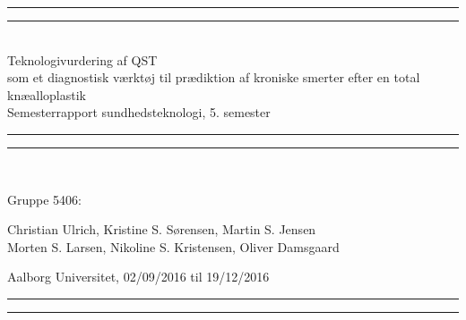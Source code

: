 \clearpage
\thispagestyle{empty}

\begin{center}
	\vspace*{\baselineskip}
	\rule{\textwidth}{1.6pt}\vspace*{-\baselineskip}\vspace*{2pt} %
	\rule{\textwidth}{0.4pt}\\[\baselineskip] %
	
	{\huge Teknologivurdering af QST \\\hspace*{2ex} som et diagnostisk værktøj til prædiktion af kroniske  smerter efter en total knæalloplastik\\[0.5\baselineskip] \large Semesterrapport sundhedsteknologi, 5. semester}\\[0.2\baselineskip] %
	
	\rule{\textwidth}{0.4pt}\vspace*{-\baselineskip}\vspace{3.2pt} %
	\rule{\textwidth}{1.6pt}\\[\baselineskip] %
	\vspace*{5\baselineskip}
	\vspace*{\fill}
	\scshape %
	{\Large Gruppe 5406:\par}
	Christian Ulrich, Kristine S. Sørensen, Martin S. Jensen \\
	Morten S. Larsen, Nikoline S. Kristensen, Oliver Damsgaard
	
	\vspace*{.2\baselineskip} %
	Aalborg Universitet,  02/09/2016 til 19/12/2016 \par %
\end{center} %
\begin{center}
	\rule{\textwidth}{0.4pt}\vspace*{-\baselineskip}\vspace{3.2pt} %
	\rule{\textwidth}{1.6pt}\\[\baselineskip] %
\end{center}